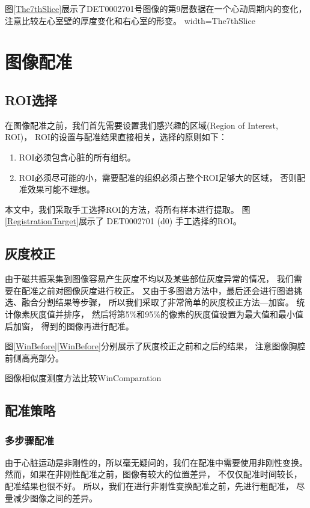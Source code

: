 图\ref{The7thSlice}展示了DET0002701号图像的第9层数据在一个心动周期内的变化，
注意比较左心室壁的厚度变化和右心室的形变。
%
{width=\textwidth}{The7thSlice}

\section{图像配准}
\subsection{ROI选择}
在图像配准之前，我们首先需要设置我们感兴趣的区域(Region of Interest, ROI)，
ROI的设置与配准结果直接相关，选择的原则如下：
\begin{enumerate}
  \item ROI必须包含心脏的所有组织。
  \item ROI必须尽可能的小，需要配准的组织必须占整个ROI足够大的区域，
    否则配准效果可能不理想。
\end{enumerate}
    本文中，我们采取手工选择ROI的方法，将所有样本进行提取。
    图\ref{RegistrationTarget}展示了 DET0002701 (d0) 手工选择的ROI。

\subsection{灰度校正}
由于磁共振采集到图像容易产生灰度不均以及某些部位灰度异常的情况，
我们需要在配准之前对图像灰度进行校正。
又由于多图谱方法中，最后还会进行图谱挑选、融合分割结果等步骤，
所以我们采取了非常简单的灰度校正方法---加窗。
统计像素灰度值并排序，
然后将第5\%和95\%的像素的灰度值设置为最大值和最小值后加窗，
得到的图像再进行配准。

图\ref{WinBefore}\ref{WinBefore}分别展示了灰度校正之前和之后的结果，
注意图像胸腔前侧高亮部分。
\begin{pics}[htpb]{图像相似度测度方法比较}{WinComparation}
\end{pics}

\subsection{配准策略}
\subsubsection{多步骤配准}
由于心脏运动是非刚性的，所以毫无疑问的，我们在配准中需要使用非刚性变换。
然而，如果在非刚性配准之前，图像有较大的位置差异，
不仅仅配准时间较长，配准结果也很不好。
所以，我们在进行非刚性变换配准之前，先进行粗配准，
尽量减少图像之间的差异。

